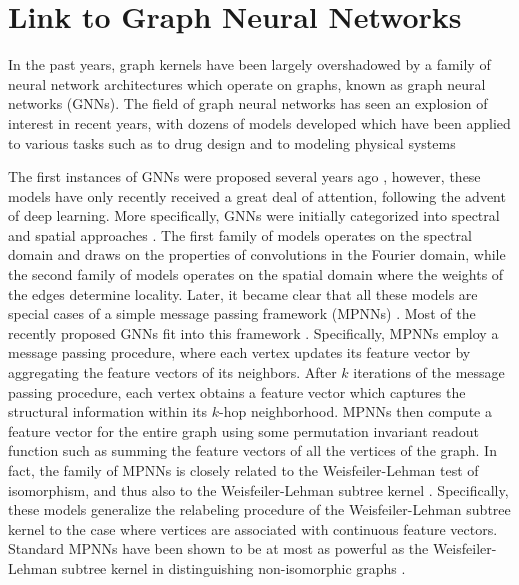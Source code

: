 \documentclass[twoside,11pt]{article}
\begin{document}
\section{Link to Graph Neural Networks}\label{sec:gnns}
In the past years, graph kernels have been largely overshadowed by a family of neural network architectures which operate on graphs, known as graph neural networks (GNNs).
The field of graph neural networks has seen an explosion of interest in recent years, with dozens of models developed which have been applied to various tasks such as to drug design  and to modeling physical systems 

The first instances of GNNs were proposed several years ago , however, these models have only recently received a great deal of attention, following the advent of
deep learning.
More specifically, GNNs were initially categorized into spectral and spatial approaches .
The first family of models operates on the spectral domain and draws on the properties
of convolutions in the Fourier domain, while the second family of models operates on the spatial domain where the weights of the edges determine locality.
Later, it became clear that all these models are special cases of a simple message passing framework (MPNNs) .
Most of the recently proposed GNNs fit into this framework .
Specifically, MPNNs employ a message passing procedure, where each vertex updates its feature vector by aggregating the feature vectors of its neighbors.
After $k$ iterations of the message passing procedure, each vertex obtains a feature vector which captures the structural information within its $k$-hop neighborhood.
MPNNs then compute a feature vector for the entire graph using some permutation invariant readout function such as summing the feature vectors of all the vertices of the graph.
In fact, the family of MPNNs is closely related to the Weisfeiler-Lehman test of isomorphism, and thus also to the Weisfeiler-Lehman subtree kernel .
Specifically, these models generalize the relabeling procedure of the Weisfeiler-Lehman subtree kernel to the case where vertices are associated with continuous feature vectors.
Standard MPNNs have been shown to be at most as powerful as the Weisfeiler-Lehman subtree kernel in distinguishing non-isomorphic graphs .
\end{document}
